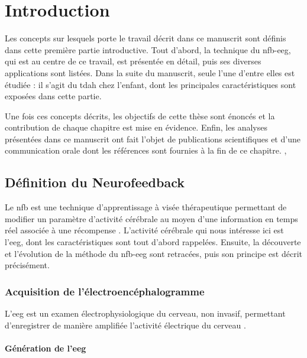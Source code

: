 \chapter{Introduction} \label{chapitre-1}

Les concepts sur lesquels porte le travail décrit dans ce manuscrit sont définis dans cette première partie introductive. Tout d'abord, la technique du \gls{nfb}-\gls{eeg}, 
qui est au centre de ce travail, est présentée en détail, puis ses diverses applications sont listées. Dans la suite du manuscrit, seule l'une d'entre elles est étudiée : 
il s'agit du \gls{tdah} chez l'enfant, dont les principales caractéristiques sont exposées dans cette partie. 

Une fois ces concepts décrits, les objectifs de cette thèse sont énoncés et la contribution de chaque chapitre est mise en évidence. Enfin, les analyses 
présentées dans ce manuscrit ont fait l'objet de publications scientifiques et d'une communication orale dont les références sont fournies à la fin de ce chapitre. , 

\clearpage 

\section{Définition du Neurofeedback}

Le \gls{nfb} est une technique d’apprentissage à visée thérapeutique permettant de modifier un paramètre d’activité cérébrale au moyen d’une 
information en temps réel associée à une récompense \citep{Arns2014}. L'activité cérébrale qui nous intéresse ici est l'\gls{eeg}, dont les caractéristiques sont tout d'abord
rappelées. Ensuite, la découverte et l'évolution de la méthode du \gls{nfb}-\gls{eeg} sont retracées, puis son principe est décrit précisément.

\subsection{Acquisition de l'électroencéphalogramme} \label{eeg_definition}

L'\gls{eeg} est un examen électrophysiologique du cerveau, non invasif, permettant d’enregistrer de manière amplifiée l'activité électrique du cerveau \citep{Nunez2006}. 

\subsubsection{Génération de l'\gls{eeg}}

